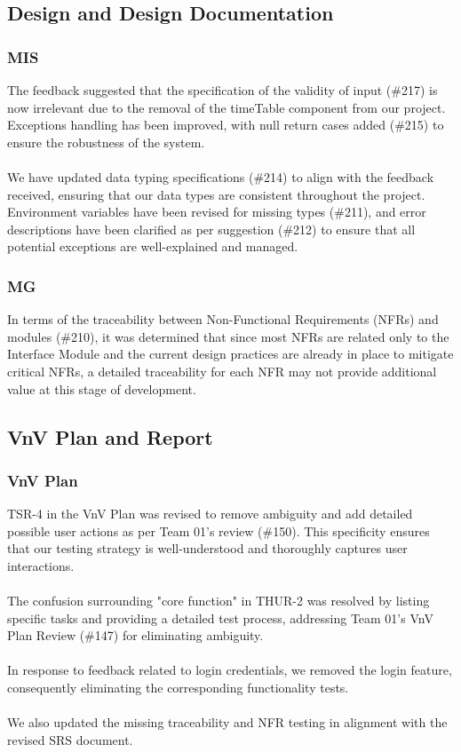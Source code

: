 \documentclass{article}
\begin{document}
\subsection{Design and Design Documentation}
\subsubsection{MIS}
The feedback suggested that the specification of the validity of input (\#217) is now irrelevant due to the removal of the timeTable component from our project. Exceptions handling has been improved, with null return cases added (\#215) to ensure the robustness of the system.\\
\\
We have updated data typing specifications (\#214) to align with the feedback received, ensuring that our data types are consistent throughout the project. Environment variables have been revised for missing types (\#211), and error descriptions have been clarified as per suggestion (\#212) to ensure that all potential exceptions are well-explained and managed.
\subsubsection{MG}
In terms of the traceability between Non-Functional Requirements (NFRs) and modules (\#210), it was determined that since most NFRs are related only to the Interface Module and the current design practices are already in place to mitigate critical NFRs, a detailed traceability for each NFR may not provide additional value at this stage of development.
\subsection{VnV Plan and Report}
\subsubsection{VnV Plan}
TSR-4 in the VnV Plan was revised to remove ambiguity and add detailed possible user actions as per Team 01's review (\#150). This specificity ensures that our testing strategy is well-understood and thoroughly captures user interactions.\\
\\
The confusion surrounding "core function" in THUR-2 was resolved by listing specific tasks and providing a detailed test process, addressing Team 01's VnV Plan Review (\#147) for eliminating ambiguity.\\
\\
In response to feedback related to login credentials, we removed the login feature, consequently eliminating the corresponding functionality tests.\\
\\
We also updated the missing traceability and NFR testing in alignment with the revised SRS document.
\end{document}

